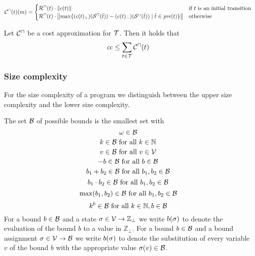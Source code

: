 \begin{definition}
  \[ {\mathcal{C}^\sqcap}(t)(m) =
  \begin{cases}
    {\mathcal{R}^\sqcap}(t) \cdot \left\Vert c(t)\right\Vert & \text{if } t \text{ is an initial transition} \\
    {\mathcal{R}^\sqcap}(t) \cdot \left\Vert\max \lbrace (c(t)_+)({\mathcal{S}^\sqcap}(\tilde{t})) - (c(t)_-)({\mathcal{S}^\sqcup}(\tilde{t})) \mid \tilde{t} \in \mathit{pre}(t) \rbrace\right\Vert & \text{otherwise}
  \end{cases}
  \]
\end{definition}

\begin{theorem}
	Let ${\mathcal{C}^\sqcap}$ be a cost approximation for $\mathcal{T}$.
	Then it holds that 
	\[ \mathit{cc} \leq \sum_{t \in \mathcal{T}} {\mathcal{C}^\sqcap}(t) \]
\end{theorem}

\subsubsection{Size complexity}

For the size complexity of a program we distinguish between the upper size complexity and the lower size complexity.

\begin{definition}
	The set $\mathcal{B}$ of possible bounds is the smallest set with
	\[ \omega \in \mathcal{B} \]
	\[ k \in \mathcal{B} \text{ for all } k \in \mathbb{N} \] 
	\[ v \in \mathcal{B} \text{ for all } v \in \mathcal{V} \] 
	\[ -b \in \mathcal{B} \text{ for all } b \in \mathcal{B} \] 
	\[ b_1 + b_2 \in \mathcal{B} \text{ for all } b_1, b_2 \in \mathcal{B} \] 
	\[ b_1 \cdot b_2 \in \mathcal{B} \text{ for all } b_1, b_2 \in \mathcal{B} \] 
	\[ \max(b_1, b_2) \in \mathcal{B} \text{ for all } b_1, b_2 \in \mathcal{B} \]
	\[ k^b \in \mathcal{B} \text{ for all } k \in \mathbb{N}, b \in \mathcal{B} \]
        For a bound $b \in \mathcal{B}$ and a state $\sigma \in \mathcal{V} \rightarrow \mathbb{Z}_\bot$ we write $b(\sigma)$ to denote the evaluation of the bound $b$ to a value in $\mathbb{Z}_\bot$.
        For a bound $b \in \mathcal{B}$ and a bound assignment $\sigma \in \mathcal{V} \rightarrow \mathcal{B}$ we write $b(\sigma)$ to denote the substitution of every variable $v$ of the bound $b$ with the appropriate value $\sigma(v) \in \mathcal{B}$.
\end{definition}


